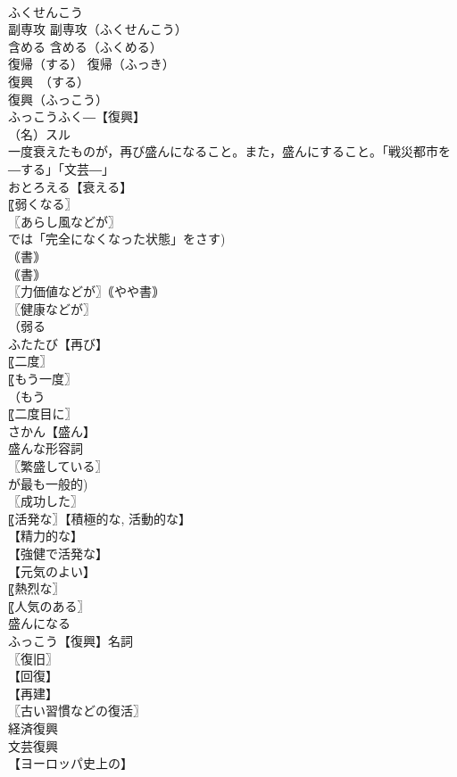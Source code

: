 \documentclass[8pt]{extreport}
\begin{document}
\begin{CJK}{UTF8}{min}
\\	ふくせんこう
\\	副専攻		副専攻（ふくせんこう）
\\	含める		含める（ふくめる）
\\	復帰（する）		復帰（ふっき）
\\	復興　（する）
\\	復興（ふっこう）
\\	ふっこうふく―【復興】
\\	（名）スル
\\	一度衰えたものが，再び盛んになること。また，盛んにすること。「戦災都市を―する」「文芸―」
\\	おとろえる【衰える】
\\	〖弱くなる〗
\\	〖あらし風などが〗
\\	では「完全になくなった状態」をさす) 
\\	｟書｠ 
\\	｟書｠ 
\\	〖力価値などが〗｟やや書｠
\\	〖健康などが〗
\\	（弱る
\\	ふたたび【再び】
\\	〖二度〗
\\	〖もう一度〗
\\	（もう 
\\	〖二度目に〗
\\	さかん【盛ん】
\\	盛んな形容詞
\\	〖繁盛している〗
\\	が最も一般的) 
\\	〖成功した〗
\\	〖活発な〗【積極的な, 活動的な】
\\	【精力的な】
\\	【強健で活発な】
\\	【元気のよい】
\\	〖熱烈な〗
\\	〖人気のある〗
\\	盛んになる 
\\	ふっこう【復興】名詞
\\	〖復旧〗
\\	【回復】
\\	【再建】
\\	〖古い習慣などの復活〗
\\	経済復興
\\	文芸復興
\\	【ヨーロッパ史上の】

\end{CJK}
\end{document}
